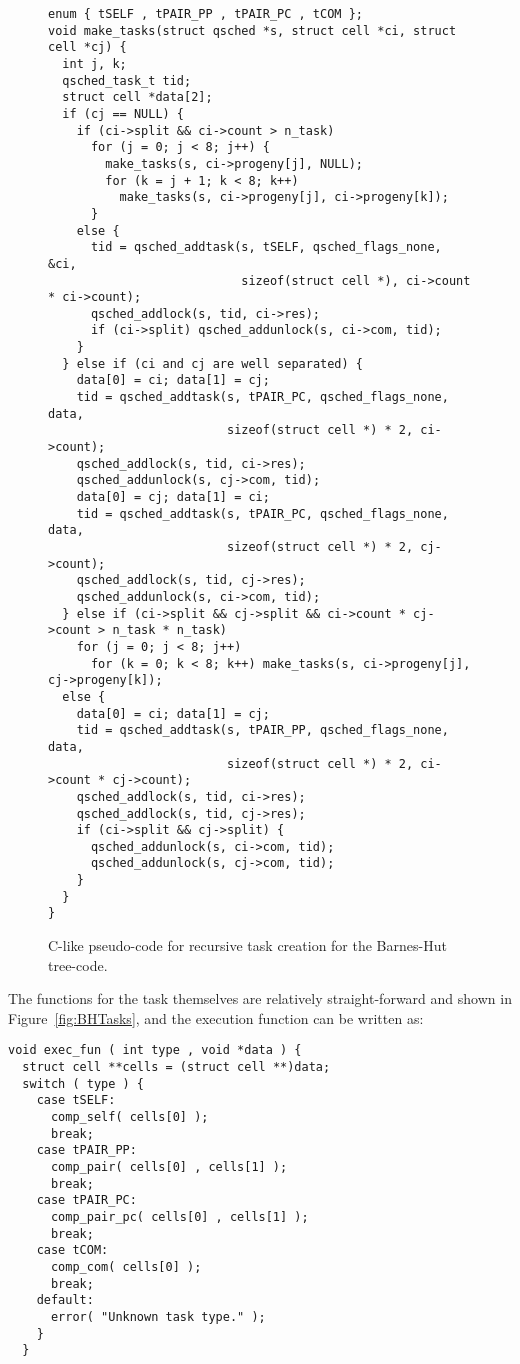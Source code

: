 \documentclass[preprint]{elsarticle}
\newcommand{\fig}[1]
    {Figure~\ref{fig:#1}}
\begin{document}
\begin{figure}
\begin{center}\begin{minipage}{0.9\textwidth}
    \begin{lstlisting}[basicstyle=\scriptsize\tt]
enum { tSELF , tPAIR_PP , tPAIR_PC , tCOM };
void make_tasks(struct qsched *s, struct cell *ci, struct cell *cj) {
  int j, k;
  qsched_task_t tid;
  struct cell *data[2];
  if (cj == NULL) {
    if (ci->split && ci->count > n_task)
      for (j = 0; j < 8; j++) {
        make_tasks(s, ci->progeny[j], NULL);
        for (k = j + 1; k < 8; k++)
          make_tasks(s, ci->progeny[j], ci->progeny[k]);
      }
    else {
      tid = qsched_addtask(s, tSELF, qsched_flags_none, &ci,
                           sizeof(struct cell *), ci->count * ci->count);
      qsched_addlock(s, tid, ci->res);
      if (ci->split) qsched_addunlock(s, ci->com, tid);
    }
  } else if (ci and cj are well separated) {
    data[0] = ci; data[1] = cj;
    tid = qsched_addtask(s, tPAIR_PC, qsched_flags_none, data,
                         sizeof(struct cell *) * 2, ci->count);
    qsched_addlock(s, tid, ci->res);
    qsched_addunlock(s, cj->com, tid);
    data[0] = cj; data[1] = ci;
    tid = qsched_addtask(s, tPAIR_PC, qsched_flags_none, data,
                         sizeof(struct cell *) * 2, cj->count);
    qsched_addlock(s, tid, cj->res);
    qsched_addunlock(s, ci->com, tid);
  } else if (ci->split && cj->split && ci->count * cj->count > n_task * n_task)
    for (j = 0; j < 8; j++)
      for (k = 0; k < 8; k++) make_tasks(s, ci->progeny[j], cj->progeny[k]);
  else {
    data[0] = ci; data[1] = cj;
    tid = qsched_addtask(s, tPAIR_PP, qsched_flags_none, data,
                         sizeof(struct cell *) * 2, ci->count * cj->count);
    qsched_addlock(s, tid, ci->res);
    qsched_addlock(s, tid, cj->res);
    if (ci->split && cj->split) {
      qsched_addunlock(s, ci->com, tid);
      qsched_addunlock(s, cj->com, tid);
    }
  }
}
    \end{lstlisting}
\end{minipage}\end{center}
    \caption{C-like pseudo-code for recursive task creation
        for the Barnes-Hut tree-code.}
    \label{fig:MakeTasks}
\end{figure}

The functions for the task themselves are relatively
straight-forward and shown in \fig{BHTasks}, and the
execution function can be written as:
\begin{center}\begin{minipage}{0.9\textwidth}
    \begin{lstlisting}
void exec_fun ( int type , void *data ) {
  struct cell **cells = (struct cell **)data;
  switch ( type ) {
    case tSELF:
      comp_self( cells[0] );
      break;
    case tPAIR_PP:
      comp_pair( cells[0] , cells[1] );
      break;
    case tPAIR_PC:
      comp_pair_pc( cells[0] , cells[1] );
      break;
    case tCOM:
      comp_com( cells[0] );
      break;
    default:
      error( "Unknown task type." );
    }
  }
    \end{lstlisting}
\end{minipage}\end{center}
\end{document}
